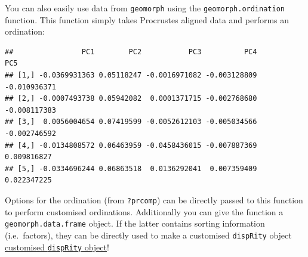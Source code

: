 \documentclass[]{book}
\newenvironment{Shaded}{\begin{snugshade}}{\end{snugshade}}
\newcommand{\KeywordTok}[1]{\textcolor[rgb]{0.13,0.29,0.53}{\textbf{#1}}}
\newcommand{\DataTypeTok}[1]{\textcolor[rgb]{0.13,0.29,0.53}{#1}}
\newcommand{\DecValTok}[1]{\textcolor[rgb]{0.00,0.00,0.81}{#1}}
\newcommand{\StringTok}[1]{\textcolor[rgb]{0.31,0.60,0.02}{#1}}
\newcommand{\OtherTok}[1]{\textcolor[rgb]{0.56,0.35,0.01}{#1}}
\newcommand{\OperatorTok}[1]{\textcolor[rgb]{0.81,0.36,0.00}{\textbf{#1}}}
\newcommand{\NormalTok}[1]{#1}
\theoremstyle{definition}
\theoremstyle{definition}
\theoremstyle{remark}
\begin{document}
You can also easily use data from \texttt{geomorph} using the
\texttt{geomorph.ordination} function. This function simply takes
Procrustes aligned data and performs an ordination:

\begin{Shaded}
\end{Shaded}

\begin{verbatim}
##                PC1        PC2           PC3          PC4          PC5
## [1,] -0.0369931363 0.05118247 -0.0016971082 -0.003128809 -0.010936371
## [2,] -0.0007493738 0.05942082  0.0001371715 -0.002768680 -0.008117383
## [3,]  0.0056004654 0.07419599 -0.0052612103 -0.005034566 -0.002746592
## [4,] -0.0134808572 0.06463959 -0.0458436015 -0.007887369  0.009816827
## [5,] -0.0334696244 0.06863518  0.0136292041  0.007359409  0.022347225
\end{verbatim}

Options for the ordination (from \texttt{?prcomp}) can be directly
passed to this function to perform customised ordinations. Additionally
you can give the function a \texttt{geomorph.data.frame} object. If the
latter contains sorting information (i.e.~factors), they can be directly
used to make a customised \texttt{dispRity} object
\protect\hyperlink{customised-subsamples}{customised \texttt{dispRity}
object}!

\begin{Shaded}
\end{Shaded}
\end{document}
